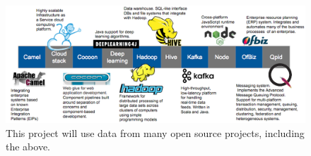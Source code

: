 \begin{figure}[!b]
    \centering
    \includegraphics[width=\linewidth]{figs/projects.png}
    \caption{This project will use data from many open source projects, including the above.}
    \label{fig:projects}
\end{figure}